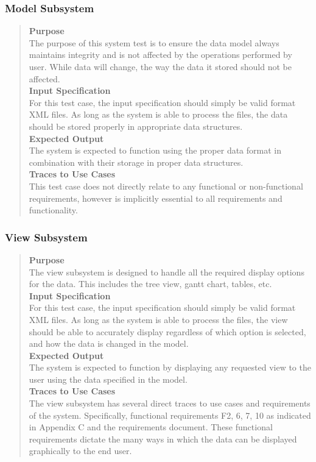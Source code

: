 \documentclass[12pt]{article}
\begin{document}
\subsubsection{Model Subsystem}
\begin{quote}
{\bf Purpose}
\\
{
The purpose of this system test is to ensure the data model always maintains integrity and is not affected by the operations performed by user. While data will change, the way the data it stored should not be affected.
}
\\ 
{\bf Input Specification}
\\
{
For this test case, the input specification should simply be valid format XML files. As long as the system is able to process the files, the data should be stored properly in appropriate data structures.
}
\\
{\bf Expected Output}
\\
{
The system is expected to function using the proper data format in combination with their storage in proper data structures.
}
\\
{\bf Traces to Use Cases}
\\
{
This test case does not directly relate to any functional or non-functional requirements, however is implicitly essential to all requirements and functionality.
}
\end{quote}
\subsubsection{View Subsystem}
\begin{quote}
{\bf Purpose}
\\
{
The view subsystem is designed to handle all the required display options for the data. This includes the tree view, gantt chart, tables, etc.
}
\\
{\bf Input Specification}
\\
{
For this test case, the input specification should simply be valid format XML files. As long as the system is able to process the files, the view should be able to accurately display regardless of which option is selected, and how the data is changed in the model.
}
\\
{\bf Expected Output}
\\
{
The system is expected to function by displaying any requested view to the user using the data specified in the model.
}
\\
{\bf Traces to Use Cases}
\\
{
The view subsystem has several direct traces to use cases and requirements of the system. Specifically, functional requirements F2, 6, 7, 10 as indicated in Appendix C and the requirements document. These functional requirements dictate the many ways in which the data can be displayed graphically to the end user.
}
\end{quote}
\end{document}
